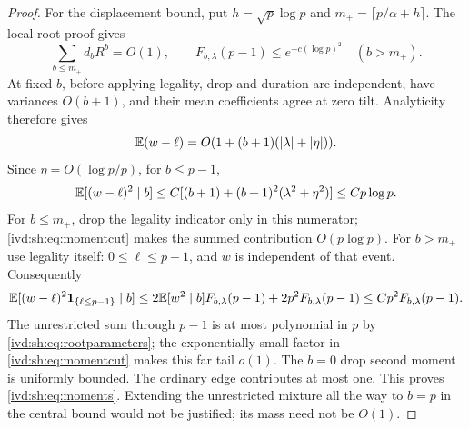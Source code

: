 \documentclass[11pt,letterpaper]{article}
\theoremstyle{remark}\newtheorem{remark}[theorem]{Remark}
\numberwithin{equation}{section}
\begin{document}
\begin{proof}
For the displacement bound, put $h=\sqrt p\log p$ and
$m_+=\lceil p/\alpha+h\rceil$. The local-root proof gives
\begin{equation}\label{ivd:sh:eq:momentcut}
 \sum_{b\le m_+}d_bR^b=O(1),\qquad
 F_{b,\lambda}(p-1)\le e^{-c(\log p)^2}\quad(b>m_+).
\end{equation}
At fixed $b$, before applying legality, drop and duration are independent,
have variances $O(b+1)$, and their mean coefficients agree at zero tilt.
Analyticity therefore gives
\[
 \mathbb E(w-\ell)=O(1+(b+1)(|\lambda|+|\eta|)).
\]
Since $\eta=O(\log p/p)$, for $b\le p-1$,
\begin{equation}\label{ivd:sh:eq:fixedbsecond}
 \mathbb E[(w-\ell)^2\mid b]
 \le C[(b+1)+(b+1)^2(\lambda^2+\eta^2)]\le Cp\log p.
\end{equation}
For $b\le m_+$, drop the legality indicator only in this numerator;
\eqref{ivd:sh:eq:momentcut} makes the summed contribution $O(p\log p)$.
For $b>m_+$ use legality itself: $0\le\ell\le p-1$, and $w$ is
independent of that event. Consequently
\[
 \mathbb E[(w-\ell)^2\mathbf1_{\{\ell\le p-1\}}\mid b]
 \le2\mathbb E[w^2\mid b]F_{b,\lambda}(p-1)+2p^2F_{b,\lambda}(p-1)
 \le Cp^2F_{b,\lambda}(p-1).
\]
The unrestricted sum through $p-1$ is at most polynomial in $p$ by
\eqref{ivd:sh:eq:rootparameters}; the exponentially small factor in
\eqref{ivd:sh:eq:momentcut} makes this far tail $o(1)$.
The $b=0$ drop second moment is uniformly bounded. The ordinary edge
contributes at most one. This proves \eqref{ivd:sh:eq:moments}.
Extending the unrestricted mixture all the way to $b=p$ in the
central bound would not be justified; its mass need not be $O(1)$.
\end{proof}
\end{document}
